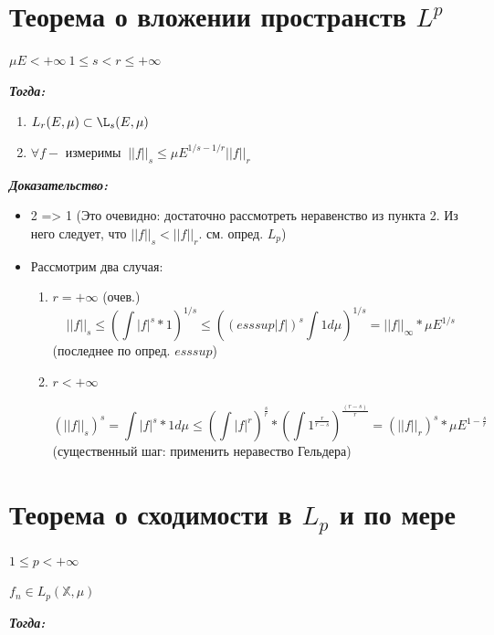 \documentclass[paper=a4, fontsize=17pt]{article}
\begin{document}
\section{Теорема о вложении пространств $L^p$}

$ \mu E < +\infty ~ 1 \leq s < r \leq + \infty$

\textbf{\emph{Тогда:}}

\begin{enumerate}
	\item $ L_r(E, \mu)  \subset \L_s(E, \mu)$
	\item $ \forall f - $ измеримы $ ~ ||f||_s \leq \mu E^{1/s - 1/r} ||f||_r$
\end{enumerate}

\textbf{\emph{Доказательство:}}

\begin{itemize}
	\item 2 => 1 (Это очевидно: достаточно рассмотреть неравенство из пункта 2. Из него следует, что $ ||f||_s < ||f||_r $. см. опред. $ L_p $)

	\item Рассмотрим два случая:
	\begin{enumerate}
		\item $ r = + \infty $ (очев.)
		$$ ||f||_s \leq (\int |f|^s * 1)^{1/s} \leq ((esssup|f|)^s \int 1 d\mu)^{1/s} = ||f||_{\infty} * \mu E^{1/s} $$ (последнее по опред. $ esssup $)

		\item $ r < + \infty $

		$$ (||f||_s)^{s} = \int |f|^s * 1 d\mu  \leq
		(\int |f|^r)^\frac{s}{r} * (\int 1^\frac{r}{r - s})^\frac{(r - s )}{r} =
		(||f||_r)^s * \mu E^{1 - \frac{s}{r}} $$ (существенный шаг: применить неравество Гельдера)
	\end{enumerate}
\end{itemize}

\section{Теорема о сходимости в $L_p$ и по мере}
$ 1 \leq p < +\infty $

$ f_n \in L_p(\mathbb{X}, \mu)$

\textbf{\emph{Тогда:}}
\end{document}
